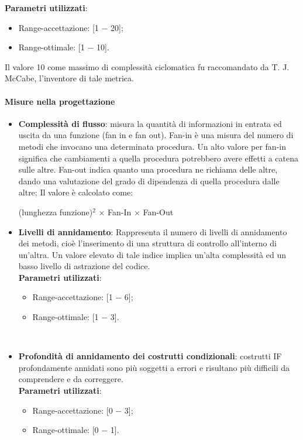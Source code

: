     \textbf{Parametri utilizzati}:
    		\begin{itemize}
    			\item Range-accettazione: [1 − 20];
    			\item Range-ottimale: [1 − 10].
    		\end{itemize}
    		Il valore 10 come massimo di complessità ciclomatica fu raccomandato da T. J. McCabe, l'inventore di tale metrica.

\paragraph{Misure nella progettazione} \linebreak
	\begin{itemize}
		\item \textbf{Complessità di flusso}: 
		misura la quantità di informazioni in entrata ed uscita da una funzione (fan in e fan out). Fan-in è una misura del numero di metodi che invocano una determinata procedura. Un alto valore per fan-in significa che cambiamenti a quella procedura potrebbero avere effetti a catena sulle altre. Fan-out indica quanto una procedura ne richiama delle altre, dando una valutazione del grado di dipendenza di quella procedura dalle altre; Il valore è calcolato come: 
		\begin{center}
					(lunghezza funzione)$^2$ × Fan-In × Fan-Out
		\end{center}
		\item \textbf{Livelli di annidamento}: Rappresenta il numero di livelli di annidamento dei metodi, cioè l'inserimento di una struttura di controllo all'interno di un'altra. Un valore elevato di tale indice implica un'alta complessità ed un basso livello di astrazione del codice. \\
		
		\textbf{Parametri utilizzati}:
		\begin{itemize}
			\item Range-accettazione: [1 − 6];
			\item Range-ottimale: [1 − 3].
		\end{itemize} \\ \bigskip
		
		\item \textbf{Profondità di annidamento dei costrutti condizionali}: costrutti IF profondamente annidati sono più soggetti a errori e risultano più difficili da comprendere e da correggere. \\
		
		\textbf{Parametri utilizzati}:
		\begin{itemize}
			\item Range-accettazione: [0 − 3];
			\item Range-ottimale: [0 − 1].
		\end{itemize} \\ 
		
	\end{itemize}
